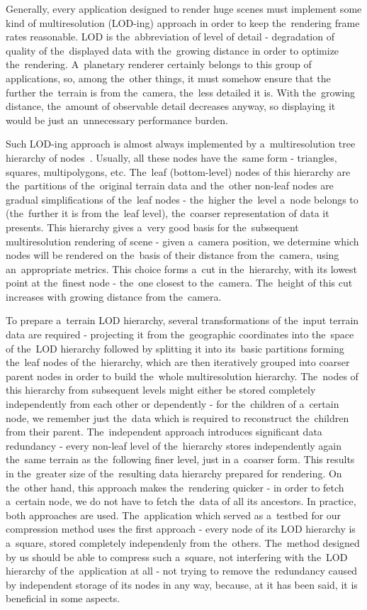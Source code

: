Generally, every application designed to render huge scenes must implement some kind of multiresolution (LOD-ing) approach in order to keep the~rendering frame rates reasonable. LOD is the~abbreviation of level of detail - degradation of quality of the~displayed data with the~growing distance in order to optimize the~rendering. A~planetary renderer certainly belongs to this group of applications, so, among the~other things, it must somehow ensure that the further the~terrain is from the~camera, the~less detailed it is. With the~growing distance, the~amount of observable detail decreases anyway, so displaying it would be just an~unnecessary performance burden. 

Such LOD-ing approach is almost always implemented by a~multiresolution tree hierarchy of nodes~\cite{survey}. Usually, all these nodes have the~same form - triangles, squares, multipolygons, etc. The~leaf (bottom-level) nodes of this hierarchy are the~partitions of the~original terrain data and the~other non-leaf nodes are gradual simplifications of the~leaf nodes - the~higher the~level a~node belongs to (the~further it is from the~leaf level), the~coarser representation of data it presents. This hierarchy gives a~very good basis for the~subsequent multiresolution rendering of scene - given a~camera position, we determine which nodes will be rendered on the~basis of their distance from the~camera, using an~appropriate metrics. This choice forms a~cut in the~hierarchy, with its lowest point at the~finest node - the~one closest to the~camera. The~height of this cut increases with growing distance from the~camera. 

To prepare a~terrain LOD hierarchy, several transformations of the~input terrain data are required - projecting it from the~geographic coordinates into the~space of the~LOD hierarchy followed by splitting it into its~basic partitions forming the~leaf nodes of the~hierarchy, which are then iteratively grouped into coarser parent nodes in order to build the~whole multiresolution hierarchy. The~nodes of this hierarchy from subsequent levels might either be stored completely independently from each other or dependently - for the~children of a~certain node, we remember just the~data which is required to reconstruct the~children from their parent. The~independent approach introduces significant data redundancy - every non-leaf level of the~hierarchy stores independently again the~same terrain as the~following finer level, just in a~coarser form. This results in the~greater size of the~resulting data hierarchy prepared for rendering. On the~other hand, this approach makes the~rendering quicker - in order to fetch a~certain node, we do not have to fetch the~data of all its ancestors. In practice, both approaches are used. The~application which served as a~testbed for our compression method uses the first approach - every node of its LOD hierarchy is a~square, stored completely independenly from the~others. The~method designed by us should be able to compress such a~square, not interfering with the~LOD hierarchy of the~application at all - not trying to remove the~redundancy caused by independent storage of its nodes in any way, because, at it has been said, it is beneficial in some aspects.

